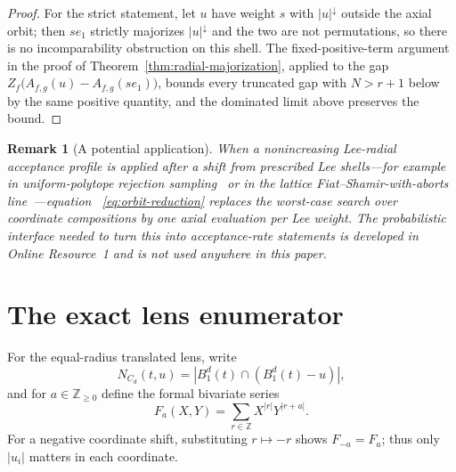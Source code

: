 \documentclass[pdflatex,sn-mathphys-num]{sn-jnl}
\theoremstyle{thmstyleone}
\theoremstyle{thmstylethree}
\theoremstyle{thmstyletwo}
\newtheorem{remark}[theorem]{Remark}
\newcommand{\Z}{\mathbb Z}
\begin{document}
\begin{appendices}
\begin{proof}
For the strict statement, let $u$ have weight $s$ with $|u|^\downarrow$
outside the axial orbit; then $se_1$ strictly majorizes $|u|^\downarrow$ and
the two are not permutations, so there is no incomparability obstruction on
this shell.  The fixed-positive-term argument in the proof of
Theorem~\ref{thm:radial-majorization}, applied to the gap
$Z_f\bigl(A_{f,g}(u)-A_{f,g}(se_1)\bigr)$, bounds every truncated gap with
$N>r+1$ below by the same positive quantity, and the dominated limit above
preserves the bound.
\end{proof}

\begin{remark}[A potential application]
\label{rem:rejection-application}
When a nonincreasing Lee-radial acceptance profile is applied after a shift
from prescribed Lee shells---for example in uniform-polytope rejection
sampling~\cite{BBRS24} or in the lattice Fiat--Shamir-with-aborts
line~\cite{Lyu09,Lyu12,DFPS22,DFPS23}---equation
~\eqref{eq:orbit-reduction} replaces the worst-case search over coordinate
compositions by one axial evaluation per Lee weight.  The probabilistic
interface needed to turn this into acceptance-rate statements is developed
in Online Resource~1 and is not used anywhere in this paper.
\end{remark}


\section{The exact lens enumerator}
\label{app:crossgf-proof}

For the equal-radius translated lens, write
\[
 N_{C_d}(t,u)=|B_1^d(t)\cap(B_1^d(t)-u)|,
\]
and for $a\in\Z_{\ge0}$ define the formal bivariate series
\[
 F_a(X,Y)=\sum_{r\in\Z}X^{|r|}Y^{|r+a|}.
\]
For a negative coordinate shift, substituting $r\mapsto-r$ shows
$F_{-a}=F_a$; thus only $|u_i|$ matters in each coordinate.


\end{appendices}
\end{document}
